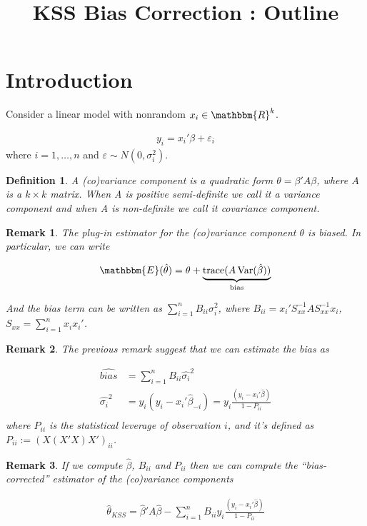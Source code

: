 \documentclass[12pt]{article}
\title{{\Large \vspace{-5em} \textbf{KSS Bias Correction : Outline} }}
\author{}
\date{}
\newtheorem{remark}{Remark}
\newtheorem{definition}[theorem]{Definition}
\DeclareMathOperator{\trace}{trace}
\DeclareMathOperator{\Var}{Var}
\begin{document}
\maketitle
\section{Introduction}
Consider a linear model with nonrandom $x_i \in \mathbbm{R}^k$. 

\begin{align*}
    y_i = x_i' \beta + \varepsilon_i
\end{align*}
where $i = 1,\dots,n$ and $\varepsilon \sim N(0, \sigma_i^2)$.

\begin{definition}
A (co)variance component is a quadratic form $\theta = \beta' A \beta $, where $A$ is a $k\times k$ matrix. When A is positive semi-definite we call it a variance component and when A is non-definite we call it covariance component.
\end{definition}

\begin{remark}
The plug-in estimator for the (co)variance component $\theta$ is biased. In particular, we can write 

\begin{align*}
    \mathbbm{E}(\hat{\theta}) = \theta + \underbrace{ \trace(A \Var(\hat{\beta}))}_\text{bias}
\end{align*}

\noindent And the bias term can be written as $\sum_{i=1}^n B_{ii} \sigma_i^2$, where $B_{ii} = x_i' S_{xx}^{-1} A S_{xx}^{-1} x_i  $, $S_{xx} = \sum_{i=1}^n x_i x_i'$.
\end{remark}

\begin{remark}
The previous remark suggest that we can estimate the bias as

\begin{align*}
    \hat{bias} &= \sum_{i=1}^n B_{ii} \hat{\sigma_i}^2 \\    
    \hat{\sigma_i}^2 &= y_i (y_i - x_i' \hat{\beta}_{-i}) = y_i \frac{(y_i - x_i ' \hat{\beta})}{1-P_{ii}}\\
\end{align*}
where $P_{ii}$ is the statistical leverage of observation $i$, and it's defined as $P_{ii} := (X (X'X) X')_{ii}$.

\end{remark}

\clearpage
\begin{remark}
If we compute $\hat{\beta}$, $B_{ii}$ and $P_{ii}$ then we can compute the ``bias-corrected'' estimator of the (co)variance components

\begin{align*}
    \hat{\theta}_{KSS} =  \hat{\beta}' A \hat{\beta} - \sum_{i=1}^n B_{ii} y_i \frac{(y_i - x_i ' \hat{\beta})}{1-P_{ii}}
\end{align*}
\end{remark}
\end{document}
